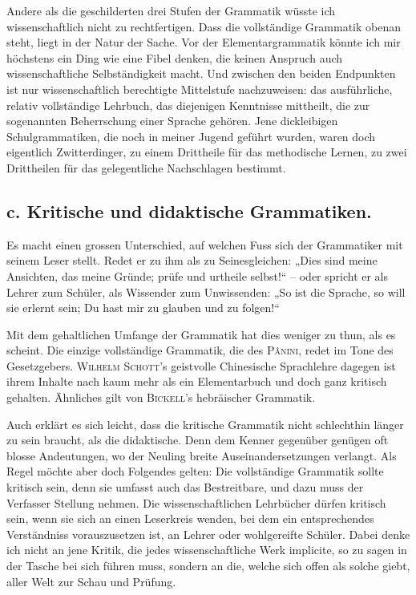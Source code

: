 \label{sp.113}

Andere als die geschilderten drei Stufen der Grammatik wüsste ich wissenschaftlich nicht zu rechtfertigen. Dass die vollständige Grammatik obenan steht, liegt in der Natur der Sache. Vor der Elementargrammatik könnte ich mir höchstens ein Ding wie eine Fibel denken, die keinen Anspruch auch wissenschaftliche Selbständigkeit macht. Und zwischen den beiden Endpunkten ist nur  wissenschaftlich berechtigte Mittelstufe nachzuweisen: das ausführliche, relativ vollständige Lehrbuch, das diejenigen Kenntnisse mittheilt, die zur sogenannten Beherrschung einer Sprache gehören. Jene dickleibigen Schulgrammatiken, die noch in meiner Jugend geführt wurden, waren doch eigentlich Zwitterdinger, zu einem Drittheile für das methodische Lernen, zu zwei Drittheilen für das gelegentliche Nachschlagen bestimmt.

\subsection*{c. Kritische und didaktische Grammatiken.}

Es macht einen grossen Unterschied, auf welchen Fuss sich der Grammatiker mit seinem Leser stellt. Redet er zu ihm als zu Seinesgleichen: „Dies sind meine Ansichten, das meine Gründe; prüfe und urtheile selbst!“ – oder spricht er als Lehrer zum Schüler, als Wissender \label{fp.119} zum Unwissenden: „So ist die Sprache, so will sie erlernt sein; Du hast mir zu glauben und zu folgen!“

Mit dem gehaltlichen Umfange der Grammatik hat dies weniger zu thun, als es scheint. Die einzige vollständige Grammatik, die des \textsc{Pânini}, redet im Tone des Gesetzgebers. \textsc{Wilhelm Schott}’s geistvolle Chinesische Sprachlehre dagegen ist ihrem Inhalte nach kaum mehr als ein Elementarbuch und doch ganz kritisch gehalten. Ähnliches gilt von  \textsc{Bickell}’s hebräischer Grammatik.

Auch erklärt es sich leicht, dass die kritische Grammatik nicht schlechthin länger zu sein braucht, als die didaktische. Denn dem Kenner gegenüber genügen oft blosse Andeutungen, wo der Neuling breite Auseinandersetzungen verlangt. Als Regel möchte aber doch Folgendes gelten: Die vollständige Grammatik sollte kritisch sein, denn sie umfasst auch das Bestreitbare, und dazu muss der Verfasser Stellung nehmen. Die wissenschaftlichen Lehrbücher dürfen kritisch sein, wenn sie sich an einen Leserkreis wenden, bei dem ein entsprechendes Verständniss vorauszusetzen ist, an Lehrer oder wohlgereifte Schüler. Dabei denke ich nicht an jene Kritik, die jedes wissenschaftliche Werk implicite, so zu sagen in der Tasche bei sich führen muss, sondern an die, welche sich offen als solche giebt, aller Welt zur Schau und Prüfung.

